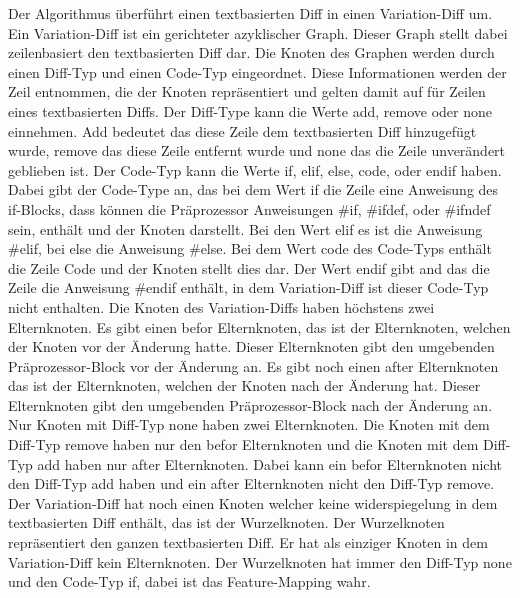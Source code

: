 Der Algorithmus überführt einen textbasierten Diff in einen Variation-Diff um. Ein Variation-Diff ist ein gerichteter azyklischer Graph. Dieser Graph stellt dabei zeilenbasiert den textbasierten Diff dar. Die Knoten des Graphen werden durch einen Diff-Typ und einen Code-Typ eingeordnet. Diese Informationen werden der Zeil entnommen, die der Knoten repräsentiert und gelten damit auf für Zeilen eines textbasierten Diffs. Der Diff-Type kann die Werte add, remove oder none einnehmen. Add bedeutet das diese Zeile dem textbasierten Diff hinzugefügt wurde, remove das diese Zeile entfernt wurde und none das die Zeile unverändert geblieben ist. Der Code-Typ kann die Werte if, elif, else, code, oder endif haben. Dabei gibt der Code-Type an, das bei dem Wert if die Zeile eine Anweisung des if-Blocks, dass können die Präprozessor Anweisungen \#if, \#ifdef, oder \#ifndef sein, enthält und der Knoten darstellt. Bei den Wert elif es ist die Anweisung \#elif, bei else die Anweisung \#else. Bei dem Wert code des Code-Typs enthält die Zeile Code und der Knoten stellt dies dar. Der Wert endif gibt and das die Zeile die Anweisung \#endif enthält, in dem Variation-Diff ist dieser Code-Typ nicht enthalten. Die Knoten des Variation-Diffs haben höchstens zwei Elternknoten. Es gibt einen befor Elternknoten, das ist der Elternknoten, welchen der Knoten vor der Änderung hatte. Dieser Elternknoten gibt den umgebenden Präprozessor-Block vor der Änderung an. Es gibt noch einen after Elternknoten das ist der Elternknoten, welchen der Knoten nach der Änderung hat. Dieser Elternknoten gibt den umgebenden Präprozessor-Block nach der Änderung an. Nur Knoten mit Diff-Typ none haben zwei Elternknoten. Die Knoten mit dem Diff-Typ remove haben nur den befor Elternknoten und die Knoten mit dem Diff-Typ add haben nur after Elternknoten. Dabei kann ein befor Elternknoten nicht den Diff-Typ add haben und ein after Elternknoten nicht den Diff-Typ remove. Der Variation-Diff hat noch einen Knoten welcher keine widerspiegelung in dem textbasierten Diff enthält, das ist der Wurzelknoten. Der Wurzelknoten repräsentiert den ganzen textbasierten Diff. Er hat als einziger Knoten in dem Variation-Diff kein Elternknoten. Der Wurzelknoten hat immer den Diff-Typ none und den Code-Typ if, dabei ist das Feature-Mapping wahr.



